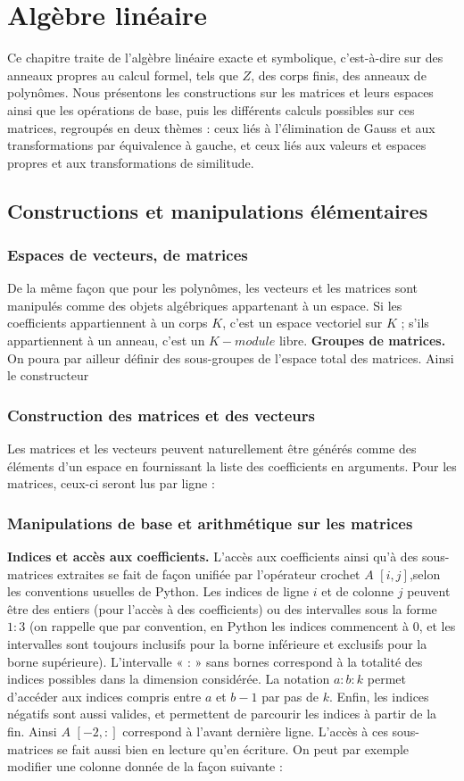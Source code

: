 \chapter{Algèbre linéaire}
Ce chapitre traite de l’algèbre linéaire exacte et symbolique, c’est-à-dire sur
des anneaux propres au calcul formel, tels que $Z$, des corps finis, des anneaux de
polynômes. Nous présentons les constructions sur les matrices et leurs espaces ainsi que les
opérations de base, puis les différents calculs possibles sur ces matrices, regroupés en deux thèmes : ceux liés à l’élimination de Gauss et aux transformations par équivalence à gauche, et ceux liés aux valeurs et espaces
propres et aux transformations de similitude.
\section{Constructions et manipulations élémentaires}
\subsection{ Espaces de vecteurs, de matrices}
De la même façon que pour les polynômes, les vecteurs et les matrices sont
manipulés comme des objets algébriques appartenant à un espace. Si les coefficients
appartiennent à un corps $K$, c’est un espace vectoriel sur $K$ ; s’ils appartiennent
à un anneau, c’est un $K-module$ libre.
\textbf{Groupes de matrices.} On poura par ailleur définir des sous-groupes de l'espace total des matrices. Ainsi le constructeur 
\subsection{ Construction des matrices et des vecteurs}
Les matrices et les vecteurs peuvent naturellement être générés comme des éléments d’un espace en fournissant la liste des coefficients en arguments. Pour les matrices, ceux-ci seront lus par ligne :
\subsection{ Manipulations de base et arithmétique sur les matrices}
\textbf{Indices et accès aux coefficients.} L'accès aux coefficients ainsi qu’à des
sous-matrices extraites se fait de façon unifiée par l’opérateur crochet $A$ $\left[i, j\right]$,selon les 
conventions usuelles de Python. Les indices de ligne $i$ et de colonne $j$ peuvent être des entiers (pour 
l’accès à des coefficients) ou des intervalles sous la forme $1:3$ (on rappelle que par convention, en Python 
les indices commencent à $0$, et les intervalles sont toujours inclusifs pour la borne inférieure et exclusifs 
pour la borne supérieure). L’intervalle « : » sans bornes correspond à la totalité des indices possibles dans la 
dimension considérée. La notation $a:b:k$ permet d’accéder aux indices compris entre $a$ et $b-1$ par pas de 
$k$. Enfin, les indices négatifs sont aussi valides, et permettent de parcourir les indices à partir de la
fin. Ainsi $A$ $\left[-2,:\right]$ correspond à l’avant dernière ligne. L'accès à ces sous-matrices
se fait aussi bien en lecture qu’en écriture. On peut par exemple modifier une colonne donnée de la façon 
suivante :
